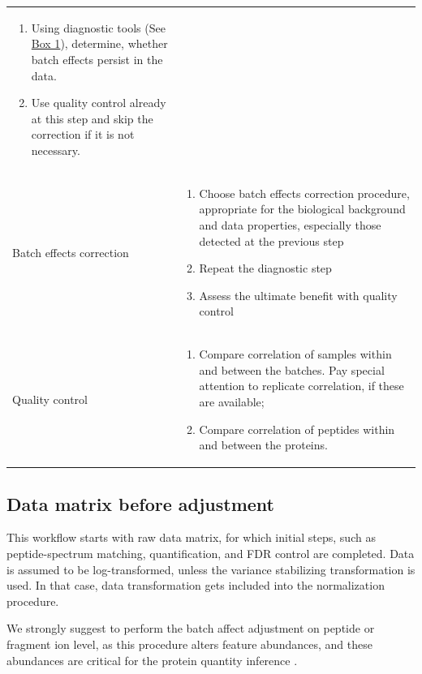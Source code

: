 \documentclass[num-refs]{wiley-article}
\begin{document}
\begin{table}[h]
\begin{tcolorbox}
\begin{tabular}{>{\raggedright}p{2cm}m{10.5cm}}
\begin{enumerate}
				\item Using diagnostic tools (See \hyperref[box:Box1_definitions]{Box 1}), determine, whether batch effects persist in the data. 
				\item Use quality control already at this step and skip the correction if it is not necessary. 
				
			\end{enumerate} \\ 
			Batch effects correction	& 	\begin{enumerate}
				\item	Choose batch effects correction procedure, appropriate for the biological background and data properties, especially those detected at the previous step
			\item	Repeat the diagnostic step
			\item	Assess the ultimate benefit with quality control
\end{enumerate} \\ 

			Quality control 	& 	\begin{enumerate}
				
				\item	Compare correlation of samples within and between the batches. Pay special attention to replicate correlation, if these are available;
				\item	Compare correlation of peptides within and between the proteins.	
			\end{enumerate} \\ 
		\end{tabular}
		
	\end{tcolorbox}
\end{table}

\subsection{Data matrix before adjustment}

This workflow starts with raw data matrix, for which initial steps, such as peptide-spectrum matching, quantification, and FDR control are completed. Data is assumed to be log-transformed, unless the variance stabilizing transformation \cite{Durbin2002} is used. In that case, data transformation gets included into the normalization procedure. 

We strongly suggest to perform the batch affect adjustment on peptide or fragment ion level, as this procedure alters feature abundances, and these abundances are critical for the protein quantity inference \cite{Clough:2012aa, Teo:2015aa}.  
\end{document}
